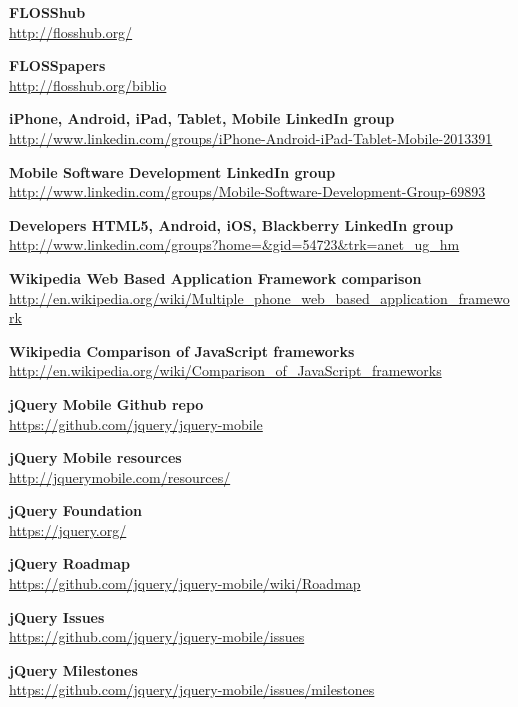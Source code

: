 \documentclass[a4paper,12pt]{book}
\begin{document}
\begin{thebibliography}{25}
\textbf{FLOSShub}\\
{\footnotesize\url{http://flosshub.org/}}

\textbf{FLOSSpapers}\\
{\footnotesize\url{http://flosshub.org/biblio}}

\textbf{iPhone, Android, iPad, Tablet, Mobile LinkedIn group}\\
{\footnotesize\url{http://www.linkedin.com/groups/iPhone-Android-iPad-Tablet-Mobile-2013391}}

\textbf{Mobile Software Development LinkedIn group}\\
{\footnotesize\url{http://www.linkedin.com/groups/Mobile-Software-Development-Group-69893}}

\textbf{Developers HTML5, Android, iOS, Blackberry LinkedIn group}\\
{\footnotesize\url{http://www.linkedin.com/groups?home=&gid=54723&trk=anet_ug_hm}}

\textbf{Wikipedia Web Based Application Framework comparison}\\
{\footnotesize\url{http://en.wikipedia.org/wiki/Multiple_phone_web_based_application_framework}}

\textbf{Wikipedia Comparison of JavaScript frameworks}\\
{\footnotesize\url{http://en.wikipedia.org/wiki/Comparison_of_JavaScript_frameworks}}

\textbf{jQuery Mobile Github repo}\\
{\footnotesize\url{https://github.com/jquery/jquery-mobile}}

\textbf{jQuery Mobile resources}\\
{\footnotesize\url{http://jquerymobile.com/resources/}}

\textbf{jQuery Foundation}\\
{\footnotesize\url{https://jquery.org/}}

\textbf{jQuery Roadmap}\\
{\footnotesize\url{https://github.com/jquery/jquery-mobile/wiki/Roadmap}}

\textbf{jQuery Issues}\\
{\footnotesize\url{https://github.com/jquery/jquery-mobile/issues}}

\textbf{jQuery Milestones}\\
{\footnotesize\url{https://github.com/jquery/jquery-mobile/issues/milestones}}


\end{thebibliography}
\end{document}
